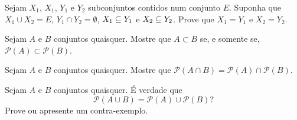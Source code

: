 \documentclass[12pt]{exam}
\begin{document}
\vspace{.3cm}

\questao{} Sejam $X_1$, $X_1$, $Y_1$ e $Y_2$ subconjuntos contidos num conjunto $E$. Suponha que $X_1 \cup X_2 = E$, $Y_1 \cap Y_2 = \emptyset$, $X_1 \subseteq Y_1$ e $X_2 \subseteq Y_2$. Prove que $X_1 = Y_1$ e $X_2 = Y_2$.

\vspace{.3cm}

\questao{} Sejam $A$ e $B$ conjuntos quaisquer. Mostre que $A \subset B$ se, e somente se, $\mathcal{P}(A) \subset \mathcal{P}(B)$.

\vspace{.3cm}

\questao{} Sejam $A$ e $B$ conjuntos quaisquer. Mostre que $\mathcal{P}(A \cap B) = \mathcal{P}(A) \cap \mathcal{P}(B)$.

\vspace{.3cm}

\questao{} Sejam $A$ e $B$ conjuntos quaisquer. É verdade que
\[
   \mathcal{P}(A \cup B) = \mathcal{P}(A) \cup \mathcal{P}(B)?
\]
Prove ou apresente um contra-exemplo.
\end{document}
